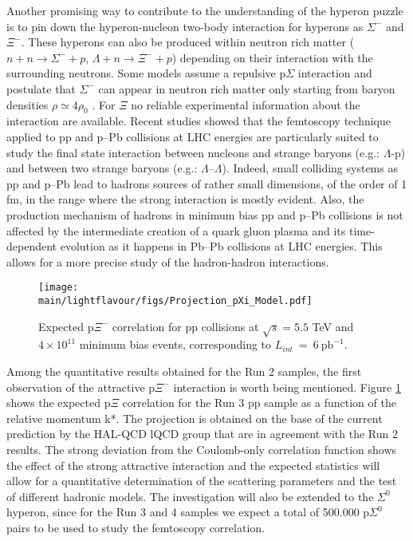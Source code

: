 Another promising way to contribute to the understanding of the hyperon puzzle is to pin down the hyperon-nucleon two-body interaction
for  hyperons as $\Sigma^{-}$ and $\Xi^-$. These hyperons can also be produced within neutron rich matter 
($n+n \rightarrow \Sigma^- + p$, $\Lambda +n \rightarrow \Xi^- +  p$) depending on their interaction with the surrounding neutrons.
Some models assume a repulsive p$\Sigma$ interaction and postulate that $\Sigma^{-}$ can appear in neutron rich matter only starting from baryon densities $\rho \simeq 4\rho_{0}$ \cite{PRC-93-035808-2016}.
For $\Xi$ no reliable experimental information about the interaction are available.
Recent studies \cite{Acharya:2018gyz} showed that the femtoscopy technique applied to  pp and p--Pb collisions at LHC energies are particularly suited to study the final state interaction between nucleons and strange baryons (e.g.: $\Lambda$\--p) and between two strange baryons (e.g.: $\Lambda$--$\Lambda$). 
Indeed, small colliding systems as pp and p--Pb lead to hadrons sources of rather small dimensions, of the order of 1 fm, in the range where the strong interaction is mostly evident.
Also, the production mechanism of hadrons in minimum bias pp and p--Pb collisions is not affected by the intermediate creation of a quark gluon plasma and its time-dependent evolution as it happens in Pb--Pb collisions at LHC energies. This allows for a more precise study of the hadron-hadron interactions.

\begin{figure}
\centering
\texttt{[image: \\main/lightflavour/figs/Projection\_pXi\_Model.pdf]}
\caption{Expected p$\Xi^-$ correlation for pp collisions at $\sqrt{s} = 5.5$ TeV and $4\times 10^{11}$ minimum bias events, corresponding to $L_{int}~=~6~\mathrm{pb}^{-1}$.}
\label{pXiProj}
\end{figure}

Among the quantitative results obtained for the Run 2 samples, the first observation of the attractive p$\Xi^-$ interaction is worth being mentioned. 
Figure \ref{pXiProj} 
shows the expected p$\Xi$ correlation for the Run 3 pp sample as a function of the relative momentum k*. 
The projection is obtained on the base of the current prediction by the HAL-QCD lQCD group that are in agreement with the Run 2 results.
The strong deviation from the Coulomb-only correlation function shows the effect of the strong attractive interaction 
and the expected statistics will allow for a quantitative determination of the scattering parameters and the test of different hadronic models.
The investigation will also be extended to the $\Sigma^0$ hyperon, since for the Run 3 and 4 samples we expect a total of 500.000 p$\Sigma^0$ pairs
to be used to study the femtoscopy correlation.

